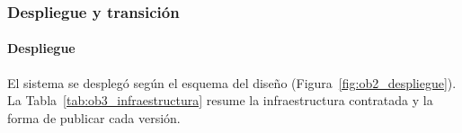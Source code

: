 
\subsubsection{Despliegue y transición}

\paragraph{Despliegue}

El sistema se desplegó según el esquema del diseño (Figura~\ref{fig:ob2_despliegue}). La Tabla~\ref{tab:ob3_infraestructura} resume la infraestructura contratada y la forma de publicar cada versión.

